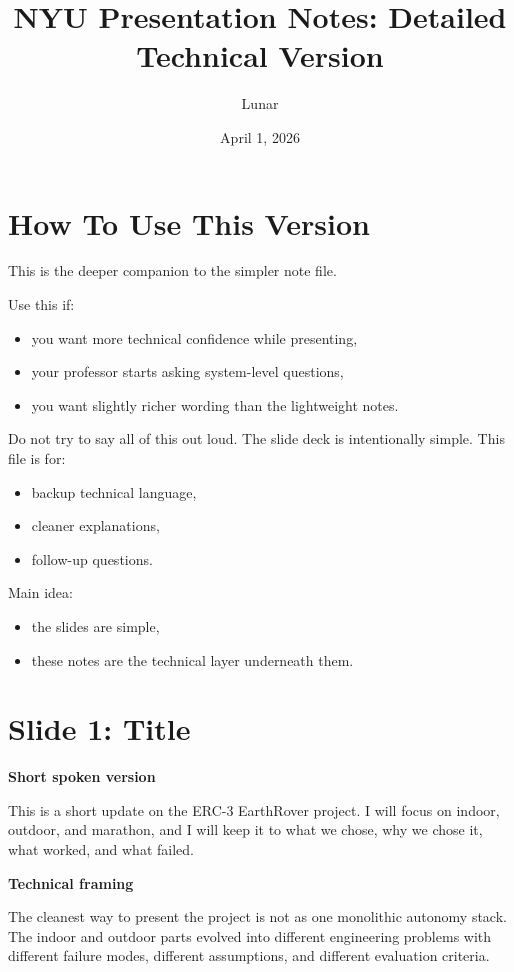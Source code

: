 \documentclass[11pt]{article}
\title{NYU Presentation Notes: Detailed Technical Version}
\author{Lunar}
\date{April 1, 2026}
\begin{document}
\maketitle
\thispagestyle{empty}

\section*{How To Use This Version}
This is the deeper companion to the simpler note file.

Use this if:
\begin{itemize}[leftmargin=*]
\item you want more technical confidence while presenting,
\item your professor starts asking system-level questions,
\item you want slightly richer wording than the lightweight notes.
\end{itemize}

Do not try to say all of this out loud. The slide deck is intentionally simple. This file is for:
\begin{itemize}[leftmargin=*]
\item backup technical language,
\item cleaner explanations,
\item follow-up questions.
\end{itemize}

Main idea:
\begin{itemize}[leftmargin=*]
\item the slides are simple,
\item these notes are the technical layer underneath them.
\end{itemize}

\section*{Slide 1: Title}
\textbf{Short spoken version}

This is a short update on the ERC-3 EarthRover project. I will focus on indoor, outdoor, and marathon, and I will keep it to what we chose, why we chose it, what worked, and what failed.

\textbf{Technical framing}

The cleanest way to present the project is not as one monolithic autonomy stack. The indoor and outdoor parts evolved into different engineering problems with different failure modes, different assumptions, and different evaluation criteria.
\end{document}
